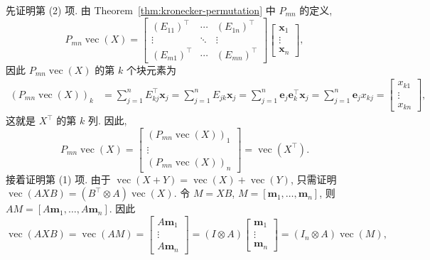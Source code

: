 \begin{Proof}
{先证明第 (2) 项. 由 Theorem\ \ref{thm:kronecker-permutation} 中 $P_{mn}$ 的定义,}
\[P_{mn}\operatorname{vec}(X)=\begin{bmatrix}
(E_{11})^{\top}&\cdots&(E_{1n})^{\top}\\\vdots&\ddots&\vdots\\(E_{m1})^{\top}&\cdots&(E_{mn})^{\top}
\end{bmatrix}\begin{bmatrix}\boldsymbol{x}_1\\\vdots\\\boldsymbol{x}_n\end{bmatrix},\]
{因此 $P_{mn}\operatorname{vec}(X)$ 的第 $k$ 个块元素为}
\[\begin{aligned}
(P_{mn}\operatorname{vec}(X))_k&=\sum_{j=1}^nE_{kj}^{\top}\boldsymbol{x}_j
=\sum_{j=1}^nE_{jk}\boldsymbol{x}_j=\sum_{j=1}^n\boldsymbol{e}_j\boldsymbol{e}_k^{\top}\boldsymbol{x}_j
=\sum_{j=1}^n\boldsymbol{e}_jx_{kj}=\begin{bmatrix}x_{k1}\\\vdots\\x_{kn}\end{bmatrix},
\end{aligned}\]
{这就是 $X^{\top}$ 的第 $k$ 列. 因此,}
\[P_{mn}\operatorname{vec}(X)=\begin{bmatrix}(P_{mn}\operatorname{vec}(X))_1\\\vdots\\(P_{mn}\operatorname{vec}(X))_n\end{bmatrix}=\operatorname{vec}(X^{\top}).\]
{接着证明第 (1) 项. 由于 $\operatorname{vec}(X+Y)=\operatorname{vec}(X)+\operatorname{vec}(Y)$, 只需证明 $\operatorname{vec}(AXB)=(B^{\top}\otimes A)\operatorname{vec}(X)$. 令 $M=XB$, $M=[\boldsymbol{m}_1,\ldots,\boldsymbol{m}_n]$, 则 $AM=[A\boldsymbol{m}_1,\ldots,A\boldsymbol{m}_n]$. 因此}
\begin{equation}\label{eq:vectorized-left-multiplication}
\operatorname{vec}(AXB)=\operatorname{vec}(AM)=\begin{bmatrix}A\boldsymbol{m}_1\\\vdots\\A\boldsymbol{m}_n\end{bmatrix}
=(I\otimes A)\begin{bmatrix}\boldsymbol{m}_1\\\vdots\\\boldsymbol{m}_n\end{bmatrix}=(I_n\otimes A)\operatorname{vec}(M),

\end{equation}
\end{Proof}
